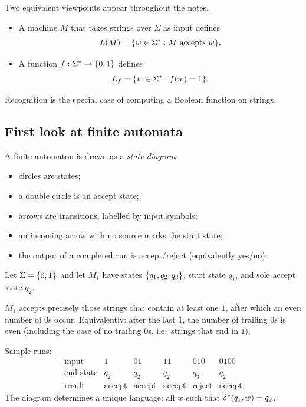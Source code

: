 Two equivalent viewpoints appear throughout the notes.
\begin{itemize}
  \item A machine $M$ that takes strings over $\Sigma$ as input defines
        \[
          L(M)=\{w\in\Sigma^*:M\text{ accepts }w\}.
        \]
  \item A function $f:\Sigma^*\to\{0,1\}$ defines
        \[
          L_f=\{w\in\Sigma^*:f(w)=1\}.
        \]
\end{itemize}
Recognition is the special case of computing a Boolean function on strings.

\subsection{First look at finite automata}
A finite automaton is drawn as a \emph{state diagram}:
\begin{itemize}
  \item circles are states;
  \item a double circle is an accept state;
  \item arrows are transitions, labelled by input symbols;
  \item an incoming arrow with no source marks the start state;
  \item the output of a completed run is accept/reject
        (equivalently yes/no).
\end{itemize}

\begin{example}
Let $\Sigma=\{0,1\}$ and let $M_1$ have states $\{q_1,q_2,q_3\}$, start
state $q_1$, and sole accept state $q_2$.
\begin{center}
\end{center}
$M_1$ accepts precisely those strings that contain at
least one $1$, after which an even number of $0$s occur. Equivalently: after
the last $1$, the number of trailing $0$s is even (including the case of no
trailing $0$s, i.e.\ strings that end in $1$).

Sample runs:
\[
\begin{array}{c|ccccc}
\text{input} & 1 & 01 & 11 & 010 & 0100\\
\hline
\text{end state} & q_2 & q_2 & q_2 & q_3 & q_2\\
\text{result} & \text{accept} & \text{accept} & \text{accept} & \text{reject} & \text{accept}
\end{array}
\]
The diagram determines a unique language: all $w$ such that
$\delta^*(q_1,w)=q_2$.
\end{example}
